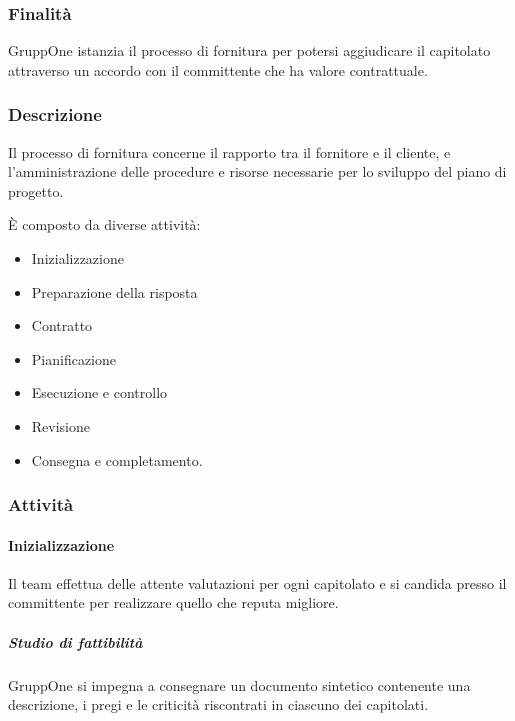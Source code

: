 \documentclass[../../norme-di-progetto.tex]{subfiles}
\begin{document}
\subsubsection{Finalità}%
\label{subs:fornitura/finalita}

GruppOne istanzia il processo di fornitura per potersi aggiudicare il capitolato attraverso un accordo con il committente che ha valore contrattuale.

\subsubsection{Descrizione}%
\label{subs:fornitura/descrizione}

Il processo di fornitura concerne il rapporto tra il fornitore e il cliente, e l'amministrazione delle procedure e risorse necessarie per lo sviluppo del piano di progetto.

È composto da diverse attività:

\begin{itemize}
  \item Inizializzazione
  \item Preparazione della risposta
  \item Contratto
  \item Pianificazione
  \item Esecuzione e controllo
  \item Revisione
  \item Consegna e completamento.
\end{itemize}

\subsubsection{Attività}%
\label{subs:fornitura/attivita}

\paragraph{Inizializzazione}%
\label{par:inizializzazione}

Il team effettua delle attente valutazioni per ogni capitolato e si candida presso il committente per realizzare quello che reputa migliore.

\subparagraph{Studio di fattibilità}%
\label{subp:studio_di_fattibilita}

GruppOne si impegna a consegnare un documento sintetico contenente una descrizione, i pregi e le criticità riscontrati in ciascuno dei capitolati.
\end{document}

